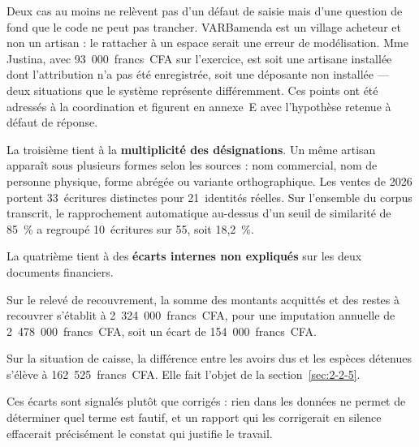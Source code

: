 Deux cas au moins ne relèvent pas d'un défaut de saisie mais d'une question de fond que le code ne peut pas trancher. VARBamenda est un village acheteur et non un artisan : le rattacher à un espace serait une erreur de modélisation. Mme Justina, avec 93~000~francs~CFA sur l'exercice, est soit une artisane installée dont l'attribution n'a pas été enregistrée, soit une déposante non installée --- deux situations que le système représente différemment. Ces points ont été adressés à la coordination et figurent en annexe~E avec l'hypothèse retenue à défaut de réponse.

La troisième tient à la \textbf{multiplicité des désignations}. Un même artisan apparaît sous plusieurs formes selon les sources : nom commercial, nom de personne physique, forme abrégée ou variante orthographique. Les ventes de 2026 portent 33~écritures distinctes pour 21~identités réelles. Sur l'ensemble du corpus transcrit, le rapprochement automatique au-dessus d'un seuil de similarité de 85~\% a regroupé 10~écritures sur 55, soit 18,2~\%.

La quatrième tient à des \textbf{écarts internes non expliqués} sur les deux documents financiers.

Sur le relevé de recouvrement, la somme des montants acquittés et des restes à recouvrer s'établit à 2~324~000~francs~CFA, pour une imputation annuelle de 2~478~000~francs~CFA, soit un écart de 154~000~francs~CFA.

Sur la situation de caisse, la différence entre les avoirs dus et les espèces détenues s'élève à 162~525~francs~CFA. Elle fait l'objet de la section~\ref{sec:2-2-5}.

Ces écarts sont signalés plutôt que corrigés : rien dans les données ne permet de déterminer quel terme est fautif, et un rapport qui les corrigerait en silence effacerait précisément le constat qui justifie le travail.

